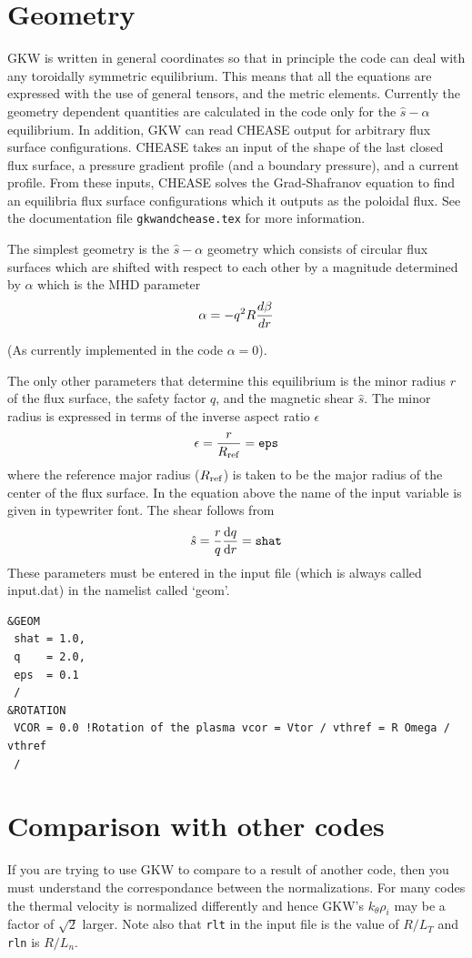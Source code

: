 \documentclass{report}
\def\be{\begin{equation}}
\def\ee{\end{equation}}
\def\black{\special     {ps: 0 0 0 setrgbcolor}}
\def\blue{\special      {ps: 0 0 1 setrgbcolor}}
\begin{document}
\section{Geometry} 
GKW is written in general coordinates so that in principle the code can deal with any toroidally symmetric 
equilibrium. This means that all the equations are expressed with the use of general tensors, and 
the metric elements. Currently the geometry dependent quantities are calculated in the code only for the $\hat s - \alpha$ equilibrium.  In addition, GKW can read CHEASE \cite{LUT96} output for
arbitrary flux
surface configurations. CHEASE takes an input of the shape of the last closed flux surface, a pressure gradient profile (and a boundary pressure), and a current profile. From these inputs, CHEASE
solves the Grad-Shafranov equation to find an equilibria flux surface configurations which it outputs as the poloidal flux. See the documentation file \texttt{gkwandchease.tex} for more information.

The simplest geometry is the 
$\hat s -\alpha$ geometry which consists of circular flux surfaces which are shifted with respect to 
each other by a magnitude determined by $\alpha$ which is the MHD parameter 
\be 
\alpha = -q^2R{d\beta \over dr}
\ee
\blue (As currently implemented in the code $\alpha = 0$).\black

The only other parameters that determine this equilibrium is the minor radius $r$ of the flux surface,
the safety factor $q$, and the magnetic shear $\hat s$. The minor radius is expressed in terms of the inverse 
aspect ratio $\epsilon$ 
\be 
\epsilon = {r \over R_{\rm ref}}  = {\tt eps}
\ee
where the reference major radius ($R_{\rm ref}$) is taken to be the major radius of the center of the
flux surface. 
In the equation above the name of the input variable is given in typewriter font. 
The shear follows from  
\be 
\hat s = {r \over q} {{\rm d} q \over {\rm d} r}  = {\tt shat} 
\ee
These parameters must be entered in the input file (which is always called input.dat) in the namelist 
called `geom'.

\begin{footnotesize}\begin{verbatim}
&GEOM
 shat = 1.0,
 q    = 2.0,
 eps  = 0.1
 /
&ROTATION
 VCOR = 0.0	!Rotation of the plasma vcor = Vtor / vthref = R Omega / vthref
 /
\end{verbatim} 
\end{footnotesize}

\section{Comparison with other codes} %
If you are trying to use GKW to compare to a result of another code, then you must understand the correspondance between the normalizations.  For many codes the thermal velocity is normalized differently and hence GKW's $k_{\theta}\rho_i$ may be a factor of $\sqrt{2}$ larger.  Note also that \texttt{rlt} in the input file is the value of $R/L_T$ and \texttt{rln} is $R/L_n$.
\end{document}
